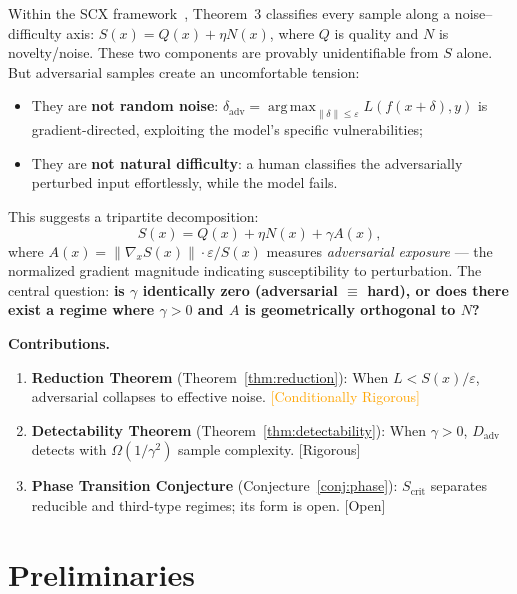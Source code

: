 \documentclass[12pt,a4paper]{article}
\newcommand{\rigorous}{\textcolor{green!50!black}{\small\textsf{[Rigorous]}}}
\newcommand{\conditionallyrigorous}{\textcolor{orange}{\small\textsf{[Conditionally Rigorous]}}}
\newcommand{\openquest}{\textcolor{red!70!black}{\small\textsf{[Open]}}}
\newcommand{\argmax}{\operatorname*{arg\,max}}
\begin{document}
Within the SCX framework~\citep{scx2024cercis}, Theorem~3 classifies every
sample along a noise--difficulty axis: $S(x) = Q(x) + \eta N(x)$, where
$Q$ is quality and $N$ is novelty/noise.  These two components are provably
unidentifiable from $S$ alone.  But adversarial samples create an
uncomfortable tension:
\begin{itemize}
    \item They are \textbf{not random noise}: $\delta_{\mathrm{adv}} =
          \argmax_{\|\delta\|\leq\varepsilon} L(f(x+\delta), y)$ is
          gradient-directed, exploiting the model's specific vulnerabilities;
    \item They are \textbf{not natural difficulty}: a human classifies the
          adversarially perturbed input effortlessly, while the model fails.
\end{itemize}

This suggests a tripartite decomposition:
\begin{equation}\label{eq:tripartite}
    S(x) = Q(x) + \eta N(x) + \gamma A(x),
\end{equation}
where $A(x) = \|\nabla_x S(x)\| \cdot \varepsilon / S(x)$ measures
\emph{adversarial exposure} — the normalized gradient magnitude indicating
susceptibility to perturbation.  The central question: \textbf{is $\gamma$
identically zero (adversarial $\equiv$ hard), or does there exist a regime
where $\gamma > 0$ and $A$ is geometrically orthogonal to $N$?}

\medskip\noindent
\textbf{Contributions.}
\begin{enumerate}[label=(\arabic*)]
    \item \textbf{Reduction Theorem} (Theorem~\ref{thm:reduction}):
          When $L < S(x)/\varepsilon$, adversarial collapses to effective
          noise.  \conditionallyrigorous
    \item \textbf{Detectability Theorem} (Theorem~\ref{thm:detectability}):
          When $\gamma > 0$, $D_{\mathrm{adv}}$ detects with
          $\Omega(1/\gamma^2)$ sample complexity.  \rigorous
    \item \textbf{Phase Transition Conjecture} (Conjecture~\ref{conj:phase}):
          $S_{\mathrm{crit}}$ separates reducible and third-type regimes;
          its form is open.  \openquest
\end{enumerate}

\section{Preliminaries}
\end{document}
